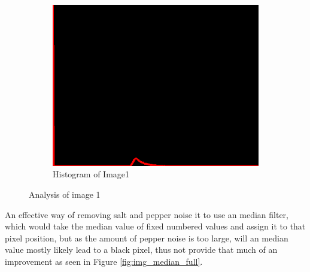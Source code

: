 \begin{figure}[H]
\begin{subfigure}[b]{0.446\textwidth}
        \includegraphics[width=\textwidth]{img1/src_hist1.png}
        \caption{Histogram of Image1}
        \label{fig:img1_hist}
    \end{subfigure}
    \caption{Analysis of image 1}\label{fig:img1}
\end{figure}

An effective way of removing salt and pepper noise it to use an median filter, which would take the median value  of fixed numbered  values and assign it to that pixel position, but as the amount of pepper noise is too large, will an median value mostly likely lead to a black pixel, thus not provide that much of an improvement as seen in Figure \ref{fig:img_median_full}.  

